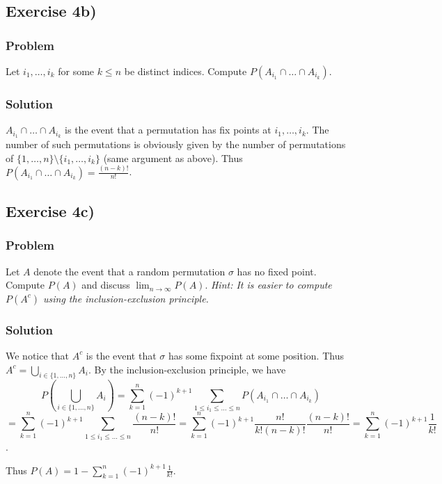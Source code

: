 \documentclass[a4paper,10pt]{article}
\begin{document}
\subsection{Exercise 4b)}

\subsubsection{Problem}
Let $i_1,\dots,i_k$ for some $k \leq n$ be distinct indices. Compute $P(A_{i_1} \cap \dots \cap A_{i_k})$.

\subsubsection{Solution}
$A_{i_1} \cap \dots \cap A_{i_k}$ is the event that a permutation has fix points at $i_1,\dots,i_k$. The number of such permutations is obviously given by the number of permutations of $\{1,\dots,n\} \setminus \{i_1,\dots,i_k\}$ (same argument as above). Thus $P(A_{i_1} \cap \dots \cap A_{i_k}) = \frac{(n-k)!}{n!}$.

\subsection{Exercise 4c)}

\subsubsection{Problem}
Let $A$ denote the event that a random permutation $\sigma$ has no fixed point. Compute $P(A)$ and
discuss $\lim_{n \rightarrow \infty} P(A)$.
\textit{Hint: It is easier to compute $P(A^c)$ using the inclusion-exclusion principle. }

\subsubsection{Solution}

We notice that $A^c$ is the event that $\sigma$ has some fixpoint at some position. Thus $A^c = \bigcup_{i \in \{1, \dots, n\}}{A_i}$. By the inclusion-exclusion principle, we have $$
  P(\bigcup_{i \in \{1, \dots, n\}}{A_i})
  = \sum_{k=1}^{n}{(-1)^{k + 1}\sum_{1 \leq i_1 \leq \dots \leq n}{P(A_{i_1} \cap \dots \cap A_{i_k})}}
$$
$$
  = \sum_{k=1}^{n}{(-1)^{k + 1}\sum_{1 \leq i_1 \leq \dots \leq n}{\frac{(n-k)!}{n!}}}
  = \sum_{k=1}^{n}{(-1)^{k + 1}\frac{n!}{k!(n-k)!}\frac{(n-k)!}{n!}}
  = \sum_{k=1}^{n}{(-1)^{k + 1}\frac{1}{k!}}
$$.

Thus $P(A) = 1 - \sum_{k=1}^{n}{(-1)^{k + 1}\frac{1}{k!}}$.
\end{document}
